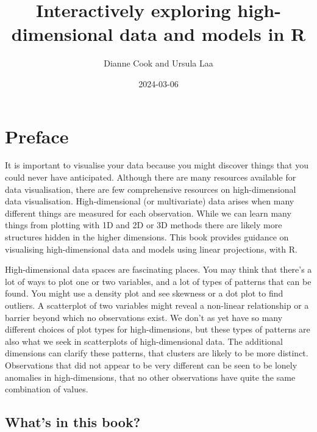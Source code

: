 \documentclass[
  letterpaper,
]{krantz}
\title{Interactively exploring high-dimensional data and models in R}
\author{Dianne Cook and Ursula Laa}
\date{2024-03-06}
\renewcommand*\contentsname{Table of contents}
\newcommand\contentsname{Table of contents}
\begin{document}
\maketitle

\renewcommand*\contentsname{Contents}
{
\hypersetup{linkcolor=}
\setcounter{tocdepth}{1}
\tableofcontents
}

\chapter*{Preface}\label{preface}


It is important to visualise your data because you might discover things
that you could never have anticipated. Although there are many resources
available for data visualisation, there are few comprehensive resources
on high-dimensional data visualisation. High-dimensional (or
multivariate) data arises when many different things are measured for
each observation. While we can learn many things from plotting with 1D
and 2D or 3D methods there are likely more structures hidden in the
higher dimensions. This book provides guidance on visualising
high-dimensional data and models using linear projections, with R.

High-dimensional data spaces are fascinating places. You may think that
there's a lot of ways to plot one or two variables, and a lot of types
of patterns that can be found. You might use a density plot and see
skewness or a dot plot to find outliers. A scatterplot of two variables
might reveal a non-linear relationship or a barrier beyond which no
observations exist. We don't as yet have so many different choices of
plot types for high-dimensions, but these types of patterns are also
what we seek in scatterplots of high-dimensional data. The additional
dimensions can clarify these patterns, that clusters are likely to be
more distinct. Observations that did not appear to be very different can
be seen to be lonely anomalies in high-dimensions, that no other
observations have quite the same combination of values.

\section*{What's in this book?}\label{whats-in-this-book}

\end{document}
